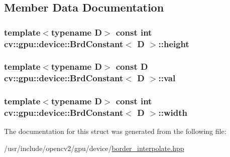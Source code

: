 \subsection{Member Data Documentation}
\hypertarget{structcv_1_1gpu_1_1device_1_1BrdConstant_a1c0a7e4780c0b5680c5308d8455d7c0d}{
\subsubsection[{height}]{\setlength{\rightskip}{0pt plus 5cm}template$<$typename D$>$ const int {\bf cv\-::gpu\-::device\-::\-Brd\-Constant}$<$ D $>$\-::height}}\label{structcv_1_1gpu_1_1device_1_1BrdConstant_a1c0a7e4780c0b5680c5308d8455d7c0d}
\hypertarget{structcv_1_1gpu_1_1device_1_1BrdConstant_a1afdc6df134068a57a36c6d32c91d719}{
\subsubsection[{val}]{\setlength{\rightskip}{0pt plus 5cm}template$<$typename D$>$ const D {\bf cv\-::gpu\-::device\-::\-Brd\-Constant}$<$ D $>$\-::val}}\label{structcv_1_1gpu_1_1device_1_1BrdConstant_a1afdc6df134068a57a36c6d32c91d719}
\hypertarget{structcv_1_1gpu_1_1device_1_1BrdConstant_a3f500717771ff41e98d7377ae7e8a45a}{
\subsubsection[{width}]{\setlength{\rightskip}{0pt plus 5cm}template$<$typename D$>$ const int {\bf cv\-::gpu\-::device\-::\-Brd\-Constant}$<$ D $>$\-::width}}\label{structcv_1_1gpu_1_1device_1_1BrdConstant_a3f500717771ff41e98d7377ae7e8a45a}


The documentation for this struct was generated from the following file\-:\begin{DoxyCompactItemize}
\item 
/usr/include/opencv2/gpu/device/\hyperlink{border__interpolate_8hpp}{border\-\_\-interpolate.\-hpp}\end{DoxyCompactItemize}
